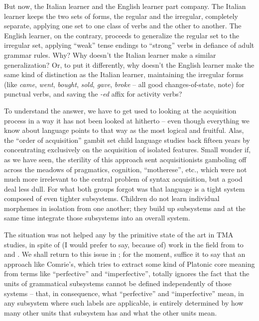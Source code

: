 But now, the Italian learner and the English learner part company. The Italian learner keeps the two sets of forms, the regular and the irregular, completely separate, applying one set to one class of verbs and the other to another. The English learner, on the contrary, proceeds to generalize the regular set to the irregular set, applying ``weak'' tense endings to ``strong'' verbs in defiance of adult grammar rules. Why? Why doesn't the Italian learner make a similar generalization? Or, to put it differently, why doesn't the English learner make the same kind of distinction as the Italian learner, maintaining the irregular forms (like \textit{came}, \textit{went}, \textit{bought}, \textit{sold}, \textit{gave}, \textit{broke} -- all good changes-of-state, note) for punctual verbs, and saving the \textit{-ed} affix for activity verbs?

To understand the answer, we have to get used to looking at the
acquisition process in a way it has not been looked at hitherto -- even though everything we know about language points to that way as the most logical and fruitful. Alas, the ``order of acquisition'' gambit set child language studies back fifteen years by concentrating exclusively on the acquisition of isolated features. Small wonder if, as we have seen, the sterility of this approach sent acquisitionists gamboling off across the meadows of pragmatics, cognition, ``motherese'', etc., which were not much more irrelevant to the central problem of syntax acquisition, but a good deal less dull. For what both groups forgot was that language is a tight system composed of even tighter subsystems. Children do not learn individual morphemes in isolation from one another; they build up subsystems and at the same time integrate those subsystems into an overall system.

The situation was not helped any by the primitive state of the art in TMA studies, in spite of (I would prefer to say, because of) work in the field from \citet{Reichenbach1947} to \citet{Comrie1976} and \citet{Woisetschlaeger1977}. We shall return to this issue in ; for the moment, suffice it to say that an approach like Comrie's, which tries to extract some kind of Platonic core meaning from terms like ``perfective'' and ``imperfective'', totally ignores the fact that the units of grammatical subsystems cannot be defined independently of those systems -- that, in consequence, what ``perfective'' and ``imperfective'' mean, in any subsystem where such labels are applicable, is entirely determined by how many other units that subsystem has and what the other units mean.\\\\


